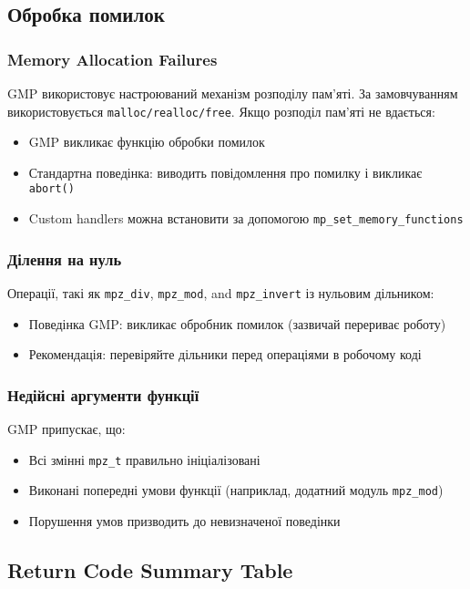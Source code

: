 \subsection{Обробка помилок}

\subsubsection{Memory Allocation Failures}
GMP використовує настроюваний механізм розподілу пам'яті. За замовчуванням використовується \texttt{malloc/realloc/free}. 
Якщо розподіл пам'яті не вдається:
\begin{itemize}
    \item GMP викликає функцію обробки помилок
    \item Стандартна поведінка: виводить повідомлення про помилку і викликає \texttt{abort()}
    \item Custom handlers можна встановити за допомогою \texttt{mp\_set\_memory\_functions}
\end{itemize}

\subsubsection{Ділення на нуль}
Операції, такі як \texttt{mpz\_div}, \texttt{mpz\_mod}, and \texttt{mpz\_invert} із нульовим дільником:
\begin{itemize}
    \item Поведінка GMP: викликає обробник помилок (зазвичай перериває роботу)
    \item Рекомендація: перевіряйте дільники перед операціями в робочому коді
\end{itemize}

\subsubsection{Недійсні аргументи функції}
GMP припускає, що:
\begin{itemize}
    \item Всі змінні \texttt{mpz\_t} правильно ініціалізовані
    \item Виконані попередні умови функції (наприклад, додатний модуль \texttt{mpz\_mod})
    \item Порушення умов призводить до невизначеної поведінки
\end{itemize}

\newpage
\subsection{Return Code Summary Table}


